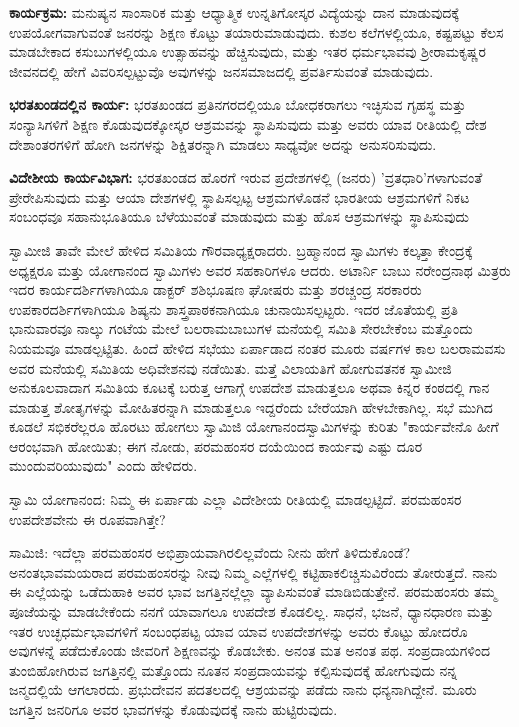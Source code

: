 \textbf{ಕಾರ್ಯಕ್ರಮ:} ಮನುಷ್ಯನ ಸಾಂಸಾರಿಕ ಮತ್ತು ಆಧ್ಯಾತ್ಮಿಕ ಉನ್ನತಿಗೋಸ್ಕರ ವಿದ್ಯೆಯನ್ನು ದಾನ ಮಾಡುವುದಕ್ಕೆ ಉಪಯೋಗವಾಗುವಂತೆ ಜನರನ್ನು ಶಿಕ್ಷಣ ಕೊಟ್ಟು ತಯಾರುಮಾಡುವುದು. ಕುಶಲ ಕಲೆಗಳಲ್ಲಿಯೂ, ಕಷ್ಟಪಟ್ಟು ಕೆಲಸ ಮಾಡಬೇಕಾದ ಕಸುಬುಗಳಲ್ಲಿಯೂ ಉತ್ಸಾಹವನ್ನು ಹೆಚ್ಚಿಸುವುದು, ಮತ್ತು ಇತರ ಧರ್ಮಭಾವವು ಶ‍್ರೀರಾಮಕೃಷ್ಣರ ಜೀವನದಲ್ಲಿ ಹೇಗೆ ವಿವರಿಸಲ್ಪಟ್ಟುವೊ ಅವುಗಳನ್ನು ಜನಸಮಾಜದಲ್ಲಿ ಪ್ರವರ್ತಿಸುವಂತೆ ಮಾಡುವುದು.

\textbf{ಭರತಖಂಡದಲ್ಲಿನ ಕಾರ್ಯ:} ಭರತಖಂಡದ ಪ್ರತಿನಗರದಲ್ಲಿಯೂ ಬೋಧಕರಾಗಲು ಇಚ್ಛಿಸುವ ಗೃಹಸ್ಥ ಮತ್ತು ಸಂನ್ಯಾಸಿಗಳಿಗೆ ಶಿಕ್ಷಣ ಕೊಡುವುದಕ್ಕೋಸ್ಕರ ಆಶ್ರಮವನ್ನು ಸ್ಥಾಪಿಸುವುದು ಮತ್ತು ಅವರು ಯಾವ ರೀತಿಯಲ್ಲಿ ದೇಶ ದೇಶಾಂತರಗಳಿಗೆ ಹೋಗಿ ಜನಗಳನ್ನು ಶಿಕ್ಷಿತರನ್ನಾಗಿ ಮಾಡಲು ಸಾಧ್ಯವೋ ಅದನ್ನು ಅನುಸರಿಸುವುದು.

\textbf{ವಿದೇಶೀಯ ಕಾರ್ಯವಿಭಾಗ:} ಭರತಖಂಡದ ಹೊರಗೆ ಇರುವ ಪ್ರದೇಶಗಳಲ್ಲಿ (ಜನರು) 'ವ್ರತಧಾರಿ'ಗಳಾಗುವಂತೆ ಪ್ರೇರೇಪಿಸುವುದು ಮತ್ತು ಆಯಾ ದೇಶಗಳಲ್ಲಿ ಸ್ಥಾಪಿಸಲ್ಪಟ್ಟ ಆಶ್ರಮಗಳೊಡನೆ ಭಾರತೀಯ ಆಶ್ರಮಗಳಿಗೆ ನಿಕಟ ಸಂಬಂಧವೂ ಸಹಾನುಭೂತಿಯೂ ಬೆಳೆಯುವಂತೆ ಮಾಡುವುದು ಮತ್ತು ಹೊಸ ಆಶ್ರಮಗಳನ್ನು ಸ್ಥಾಪಿಸುವುದು

ಸ್ವಾಮೀಜಿ ತಾವೇ ಮೇಲೆ ಹೇಳಿದ ಸಮಿತಿಯ ಗೌರವಾಧ್ಯಕ್ಷರಾದರು. ಬ್ರಹ್ಮಾನಂದ ಸ್ವಾಮಿಗಳು ಕಲ್ಕತ್ತಾ ಕೇಂದ್ರಕ್ಕೆ ಅಧ್ಯಕ್ಷರೂ ಮತ್ತು ಯೋಗಾನಂದ ಸ್ವಾಮಿಗಳು ಅವರ ಸಹಕಾರಿಗಳೂ ಆದರು. ಅಟಾರ್ನಿ ಬಾಬು ನರೇಂದ್ರನಾಥ ಮಿತ್ರರು ಇದರ ಕಾರ್ಯದರ್ಶಿಗಳಾಗಿಯೂ ಡಾಕ್ಟರ್ ಶಶಿಭೂಷಣ ಘೋಷರು ಮತ್ತು ಶರಚ್ಚಂದ್ರ ಸರಕಾರರು ಉಪಕಾರದರ್ಶಿಗಳಾಗಿಯೂ ಶಿಷ್ಯನು ಶಾಸ್ತ್ರಪಾಠಕನಾಗಿಯೂ ಚುನಾಯಿಸಲ್ಪಟ್ಟರು. ಇದರ ಜೊತೆಯಲ್ಲಿ ಪ್ರತಿ ಭಾನುವಾರವೂ ನಾಲ್ಕು ಗಂಟೆಯ ಮೇಲೆ ಬಲರಾಮಬಾಬುಗಳ ಮನೆಯಲ್ಲಿ ಸಮಿತಿ ಸೇರಬೇಕೆಂಬ ಮತ್ತೊಂದು ನಿಯಮವೂ ಮಾಡಲ್ಪಟ್ಟಿತು. ಹಿಂದೆ ಹೇಳಿದ ಸಭೆಯು ಏರ್ಪಾಡಾದ ನಂತರ ಮೂರು ವರ್ಷಗಳ ಕಾಲ ಬಲರಾಮವಸು ಅವರ ಮನೆಯಲ್ಲಿ ಸಮಿತಿಯ ಅಧಿವೇಶನವು ನಡೆಯಿತು. ಮತ್ತೆ ವಿಲಾಯತಿಗೆ ಹೋಗುವತನಕ ಸ್ವಾಮೀಜಿ ಅನುಕೂಲವಾದಾಗ ಸಮಿತಿಯ ಕೂಟಕ್ಕೆ ಬರುತ್ತ ಆಗಾಗ್ಗೆ ಉಪದೇಶ ಮಾಡುತ್ತಲೂ ಅಥವಾ ಕಿನ್ನರ ಕಂಠದಲ್ಲಿ ಗಾನ ಮಾಡುತ್ತ ಶೋತೃಗಳನ್ನು ಮೋಹಿತರನ್ನಾಗಿ ಮಾಡುತ್ತಲೂ ಇದ್ದರೆಂದು ಬೇರೆಯಾಗಿ ಹೇಳಬೇಕಾಗಿಲ್ಲ. ಸಭೆ ಮುಗಿದ ಕೂಡಲೆ ಸಭಿಕರೆಲ್ಲರೂ ಹೊರಟು ಹೋಗಲು ಸ್ವಾಮಿಜಿ ಯೋಗಾನಂದಸ್ವಾಮಿಗಳನ್ನು ಕುರಿತು "ಕಾರ್ಯವೇನೊ ಹೀಗೆ ಆರಂಭವಾಗಿ ಹೋಯಿತು; ಈಗ ನೋಡು, ಪರಮಹಂಸರ ದಯೆಯಿಂದ ಕಾರ್ಯವು ಎಷ್ಟು ದೂರ ಮುಂದುವರಿಯುವುದು" ಎಂದು ಹೇಳಿದರು.

ಸ್ವಾಮಿ ಯೋಗಾನಂದ: ನಿಮ್ಮ ಈ ಏರ್ಪಾಡು ಎಲ್ಲಾ ವಿದೇಶೀಯ ರೀತಿಯಲ್ಲಿ ಮಾಡಲ್ಪಟ್ಟಿದೆ. ಪರಮಹಂಸರ ಉಪದೇಶವೇನು ಈ ರೂಪವಾಗಿತ್ತೇ?

ಸಾಮಿಜಿ: ಇದೆಲ್ಲಾ ಪರಮಹಂಸರ ಅಭಿಪ್ರಾಯವಾಗಿರಲಿಲ್ಲವೆಂದು ನೀನು ಹೇಗೆ ತಿಳಿದುಕೊಂಡೆ? ಅನಂತಭಾವಮಯರಾದ ಪರಮಹಂಸರನ್ನು ನೀವು ನಿಮ್ಮ ಎಲ್ಲೆಗಳಲ್ಲಿ ಕಟ್ಟಿಹಾಕಲಿಚ್ಚಿಸುವಿರೆಂದು ತೋರುತ್ತದೆ. ನಾನು ಈ ಎಲ್ಲೆಯನ್ನು ಒಡೆದುಹಾಕಿ ಅವರ ಭಾವ ಜಗತ್ತಿನಲ್ಲೆಲ್ಲಾ ವ್ಯಾಪಿಸುವಂತೆ ಮಾಡಿಬಿಡುತ್ತೇನೆ. ಪರಮಹಂಸರು ತಮ್ಮ ಪೂಜೆಯನ್ನು ಮಾಡಬೇಕೆಂದು ನನಗೆ ಯಾವಾಗಲೂ ಉಪದೇಶ ಕೊಡಲಿಲ್ಲ. ಸಾಧನೆ, ಭಜನೆ, ಧ್ಯಾನಧಾರಣ ಮತ್ತು ಇತರ ಉಚ್ಛಧರ್ಮಭಾವಗಳಿಗೆ ಸಂಬಂಧಪಟ್ಟ ಯಾವ ಯಾವ ಉಪದೇಶಗಳನ್ನು ಅವರು ಕೊಟ್ಟು ಹೋದರೊ ಅವುಗಳನ್ನೆ ಪಡೆದುಕೊಂಡು ಜೀವರಿಗೆ ಶಿಕ್ಷಣವನ್ನು ಕೊಡಬೇಕು. ಅನಂತ ಮತ ಅನಂತ ಪಥ. ಸಂಪ್ರದಾಯಗಳಿಂದ ತುಂಬಿಹೋಗಿರುವ ಜಗತ್ತಿನಲ್ಲಿ ಮತ್ತೊಂದು ನೂತನ ಸಂಪ್ರದಾಯವನ್ನು ಕಲ್ಪಿಸುವುದಕ್ಕೆ ಹೋಗುವುದು ನನ್ನ ಜನ್ಮದಲ್ಲಿಯೆ ಆಗಲಾರದು. ಪ್ರಭುದೇವನ ಪದತಲದಲ್ಲಿ ಆಶ್ರಯವನ್ನು ಪಡೆದು ನಾನು ಧನ್ಯನಾಗಿದ್ದೇನೆ. ಮೂರು ಜಗತ್ತಿನ ಜನರಿಗೂ ಅವರ ಭಾವಗಳನ್ನು ಕೊಡುವುದಕ್ಕೆ ನಾನು ಹುಟ್ಟಿರುವುದು.

